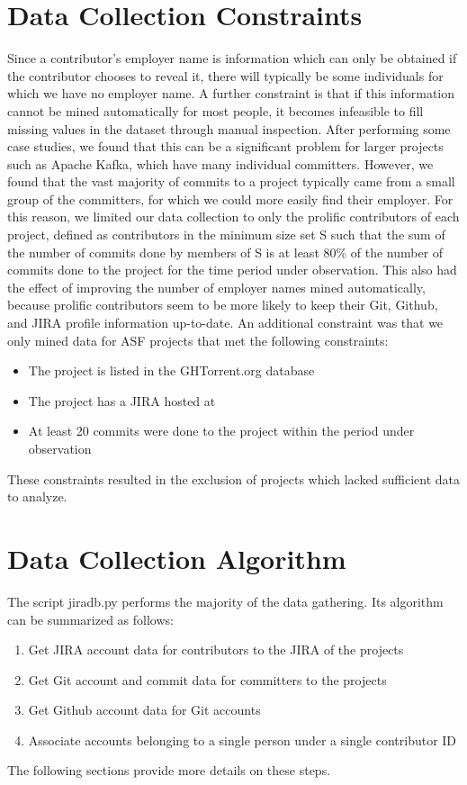 \section{Data Collection Constraints}
Since a contributor’s employer name is information which can only be obtained if the contributor chooses to reveal it, there will typically be some individuals for which we have no employer name. A further constraint is that if this information cannot be mined automatically for most people, it becomes infeasible to fill missing values in the dataset through manual inspection. After performing some case studies, we found that this can be a significant problem for larger projects such as Apache Kafka, which have many individual committers. However, we found that the vast majority of commits to a project typically came from a small group of the committers, for which we could more easily find their employer. For this reason, we limited our data collection to only the prolific contributors of each project, defined as contributors in the minimum size set S such that the sum of the number of commits done by members of S is at least 80\% of the number of commits done to the project for the time period under observation. This also had the effect of improving the number of employer names mined automatically, because prolific contributors seem to be more likely to keep their Git, Github, and JIRA profile information up-to-date.
An additional constraint was that we only mined data for ASF projects that met the following constraints:
\begin{itemize}
	\item The project is listed in the GHTorrent.org database
	\item The project has a JIRA hosted at \ASFJIRAURL
	\item At least 20 commits were done to the project within the period under observation
\end{itemize}
These constraints resulted in the exclusion of projects which lacked sufficient data to analyze.

\section{Data Collection Algorithm}
The script jiradb.py performs the majority of the data gathering. Its algorithm can be summarized as follows:
\begin{enumerate}
	\item Get JIRA account data for contributors to the JIRA of the projects
	\item Get Git account and commit data for committers to the projects
	\item Get Github account data for Git accounts
	\item Associate accounts belonging to a single person under a single contributor ID
\end{enumerate}
The following sections provide more details on these steps.

